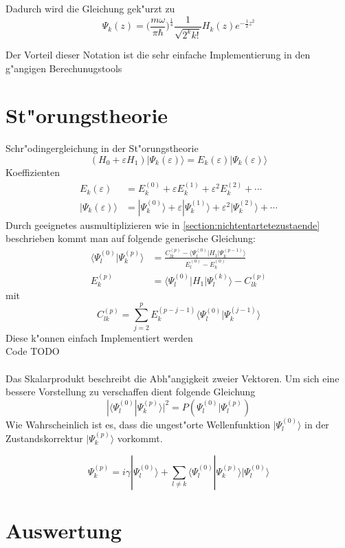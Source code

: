 \begin{refsection}
Dadurch wird die Gleichung gek"urzt zu
\[
\Psi_k(z)
=
\biggl(\frac{m\omega}{\pi\hbar}\biggr)^\frac14
\frac1{\sqrt{2^k k!}}H_k(z)
e^{-\frac12 z^2}
\]

Der Vorteil dieser Notation ist die sehr einfache Implementierung in den g"angigen Berechunugstools

\section{St"orungstheorie}
Schr"odingergleichung in der St"orungstheorie
\[
(H_0+\varepsilon H_1)|\Psi_k(\varepsilon)\rangle
=
E_k(\varepsilon)|\Psi_k(\varepsilon)\rangle
\]
Koeffizienten
\begin{align*}
E_k(\varepsilon)
&=
E_k^{(0)}+\varepsilon E_k^{(1)}+\varepsilon^2 E_k^{(2)}+\dotsb
\\
|\Psi_k(\varepsilon)\rangle
&=
|\Psi_k^{(0)}\rangle+\varepsilon|\Psi_k^{(1)}\rangle+
\varepsilon^2|\Psi_k^{(2)}\rangle+\dotsb
\end{align*}
Durch geeignetes ausmultiplizieren wie in \ref{section:nichtentartetezustaende}  beschrieben kommt man auf folgende generische Gleichung:
\begin{align*}
\langle\Psi_l^{(0)}|\Psi_k^{(p)}\rangle
&=
\frac{C_{lk}^{(p)}-\langle\Psi_l^{(0)}|H_1|\Psi_k^{(p-1)}\rangle}
{E_l^{(0)}-E_k^{(0)}}
\\
E_k^{(p)}
&=
\langle\Psi_l^{(0)}|H_1|\Psi_l^{(k)}\rangle-C_{lk}^{(p)}
\end{align*}
mit
\[
C_{lk}^{(p)}
=
\displaystyle\sum_{j=2}^{p} E_k^{(p-j-1)}
\langle\Psi_l^{(0)}|\Psi_k^{(j-1)}\rangle
\]
Diese k"onnen einfach Implementiert werden\\
Code TODO\\
\\
Das Skalarprodukt beschreibt die Abh"angigkeit zweier Vektoren. Um sich eine bessere Vorstellung zu verschaffen dient folgende Gleichung
\[
|\langle\Psi_l^{(0)}|\Psi_k^{(p)}\rangle|^2
=
P(\Psi_l^{(0)}|\Psi_l^{(p)})
\]
Wie Wahrscheinlich ist es, dass die ungest"orte Wellenfunktion $|\Psi_l^{(0)}\rangle$ in der Zustandskorrektur $|\Psi_k^{(p)}\rangle$ vorkommt.

\[
\Psi_k^{(p)}
=
i\gamma|\Psi_l^{(0)}\rangle+
\displaystyle\sum_{l\neq k} \langle\Psi_l^{(0)}|\Psi_k^{(p)}\rangle
|\Psi_l^{(0)}\rangle
\]
\section{Auswertung}


\end{refsection}
